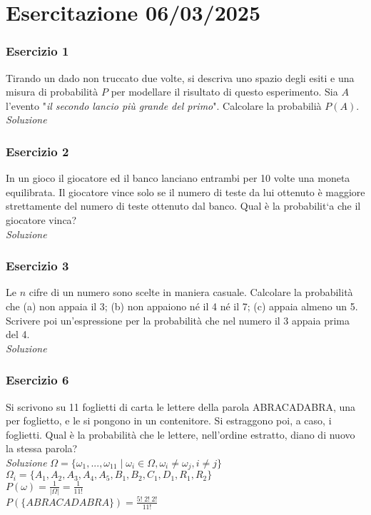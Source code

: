 \section{Esercitazione 06/03/2025}
\subsubsection{Esercizio 1}
Tirando un dado non truccato due volte, si descriva uno spazio degli esiti e una misura di probabilità $P$ per modellare il risultato di questo esperimento. Sia $A$ l’evento "\textit{il secondo lancio più grande del primo}". Calcolare la probabilià $P(A)$.
\\

\textit{Soluzione} \quad 

\subsubsection{Esercizio 2}
In un gioco il giocatore ed il banco lanciano entrambi per 10 volte una moneta equilibrata. Il giocatore vince solo se il numero di teste da lui ottenuto è maggiore strettamente del numero di teste ottenuto dal banco. Qual è la probabilit`a che il giocatore vinca?
\\

\textit{Soluzione} \quad 

\subsubsection{Esercizio 3}
Le $n$ cifre di un numero sono scelte in maniera casuale. Calcolare la probabilità che
(a) non appaia il 3;
(b) non appaiono né il 4 né il 7; (c) appaia almeno un 5.
Scrivere poi un’espressione per la probabilità che nel numero il 3 appaia prima del 4.
\\

\textit{Soluzione} \quad 

\subsubsection{Esercizio 6} Si scrivono su 11 foglietti di carta le lettere della parola ABRACADABRA, una per foglietto, e le si pongono in un contenitore. Si estraggono poi, a caso, i foglietti. Qual è la probabilità che le lettere, nell’ordine estratto, diano di nuovo la stessa parola?
\\

\textit{Soluzione} \quad 
$\Omega =\{\omega_1,...,\omega_{11} \; | \; \omega_i \in \Omega, \omega_i \ne \omega_j , i\ne j\}$ 
\\

$\Omega_i = \{A_1,A_2,A_3,A_4,A_5,B_1,B_2,C_1,D_1,R_1,R_2\}$ 
\\

$P(\omega)=\frac{1}{|\Omega|}=\frac{1}{11!}$
\\

$P(\{ABRACADABRA\})=\frac{5! \;2!\; 2!}{11!}$
